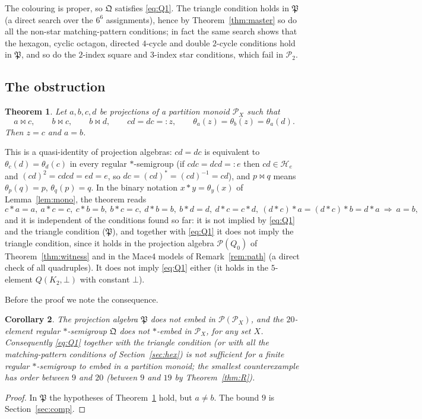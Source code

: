 \documentclass[11pt]{amsart}
\newtheorem{theorem}{Theorem}[section]
\newtheorem{corollary}[theorem]{Corollary}
\theoremstyle{definition}
\newcommand{\Hh}{\mathcal{H}}
\renewcommand{\P}{\mathcal{P}}
\newcommand{\mt}{\bowtie}   %
\begin{document}
The colouring is proper, so $\mathfrak Q$ satisfies \eqref{eq:Q1}. The triangle condition holds in $\mathfrak P$ (a direct search over the $6^6$ assignments), hence by Theorem~\ref{thm:master} so do all the non-star matching-pattern conditions; in fact the same search shows that the hexagon, cyclic octagon, directed $4$-cycle and double $2$-cycle conditions hold in $\mathfrak P$, and so do the $2$-index square and $3$-index star conditions, which fail in $\P_2$.

\subsection{The obstruction}

\begin{theorem}\label{thm:wiring}
Let $a,b,c,d$ be projections of a partition monoid $\P_X$ such that
\[
a\mt c,\qquad b\mt c,\qquad b\mt d,\qquad cd=dc=:z,\qquad \theta_a(z)=\theta_b(z)=\theta_a(d).
\]
Then $z=c$ and $a=b$.
\end{theorem}

This is a quasi-identity of projection algebras: $cd=dc$ is equivalent to $\theta_c(d)=\theta_d(c)$ in every regular $*$-semigroup (if $cdc=dcd=:e$ then $cd\in\Hh_e$ and $(cd)^2=cdcd=ed=e$, so $dc=(cd)^*=(cd)^{-1}=cd$), and $p\mt q$ means $\theta_p(q)=p$, $\theta_q(p)=q$. In the binary notation $x*y=\theta_y(x)$ of Lemma~\ref{lem:mono}, the theorem reads
\[
c*a=a,\ a*c=c,\ c*b=b,\ b*c=c,\ d*b=b,\ b*d=d,\ d*c=c*d,\ (d*c)*a=(d*c)*b=d*a\ \Longrightarrow\ a=b,
\]
and it is independent of the conditions found so far: it is not implied by \eqref{eq:Q1} and the triangle condition ($\mathfrak P$), and together with \eqref{eq:Q1} it does not imply the triangle condition, since it holds in the projection algebra $\P(Q_0)$ of Theorem~\ref{thm:witness} and in the Mace4 models of Remark~\ref{rem:path} (a direct check of all quadruples). It does not imply \eqref{eq:Q1} either (it holds in the $5$-element $Q(K_2,\bot)$ with constant $\bot$).

Before the proof we note the consequence.

\begin{corollary}\label{cor:wiring}
The projection algebra $\mathfrak P$ does not embed in $\P(\P_X)$, and the $20$-element regular $*$-semigroup $\mathfrak Q$ does not $*$-embed in $\P_X$, for any set $X$. Consequently \eqref{eq:Q1} together with the triangle condition (or with all the matching-pattern conditions of Section~\ref{sec:hex}) is not sufficient for a finite regular $*$-semigroup to embed in a partition monoid; the smallest counterexample has order between $9$ and $20$ (between $9$ and $19$ by Theorem~\ref{thm:R}).
\end{corollary}
\begin{proof}
In $\mathfrak P$ the hypotheses of Theorem~\ref{thm:wiring} hold, but $a\ne b$. The bound $9$ is Section~\ref{sec:comp}.
\end{proof}
\end{document}
